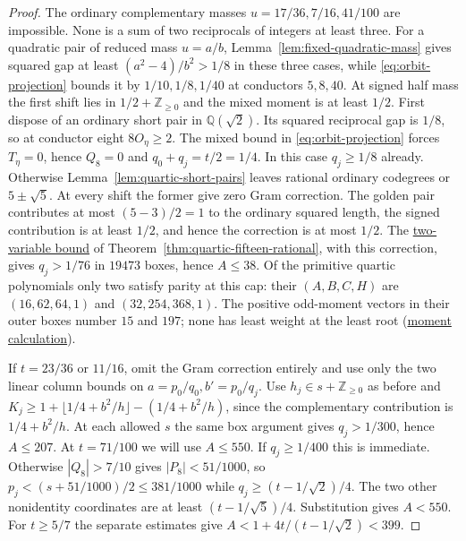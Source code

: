 \documentclass[11pt,reqno]{amsart}
\newcommand{\codecheck}[2]{\href{https://github.com/sebastienpalcoux/grothendieck-ring-classification/blob/d5750105bb5758f3ad38d2e5464dfcc12c019816/supplements/rank6/sphericality/#1}{#2}}
\theoremstyle{remark}\newtheorem{remark}[theorem]{Remark}
\numberwithin{equation}{section}
\begin{document}
\begin{proof}
The ordinary complementary masses $u=17/36,7/16,41/100$ are
impossible. None is a sum of two reciprocals of integers at least
three. For a quadratic pair of reduced mass $u=a/b$,
Lemma~\ref{lem:fixed-quadratic-mass} gives squared gap at least
$(a^2-4)/b^2>1/8$ in these three cases, while
\eqref{eq:orbit-projection} bounds it by $1/10,1/8,1/40$ at
conductors $5,8,40$.
At signed half mass the first shift lies in
$1/2+\mathbb Z_{\ge0}$ and the mixed moment is at least $1/2$.
First dispose of an ordinary short pair in $\mathbb Q(\sqrt2)$.
Its squared reciprocal gap is $1/8$, so at conductor eight
$8O_\eta\ge2$. The mixed bound in \eqref{eq:orbit-projection}
forces $T_\eta=0$, hence $Q_8=0$ and
$q_0+q_j=t/2=1/4$. In this case $q_j\ge1/8$ already.
Otherwise Lemma~\ref{lem:quartic-short-pairs} leaves rational ordinary
codegrees or $5\pm\sqrt5$. At every shift the former give zero
Gram correction. The golden pair contributes at most $(5-3)/2=1$
to the ordinary squared length, the signed contribution is at least
$1/2$, and hence the correction is at most $1/2$.
The \codecheck{quartic_more/verify.py}{two-variable bound} of
Theorem~\ref{thm:quartic-fifteen-rational}, with this correction,
gives $q_j>1/76$ in $19473$ boxes, hence $A\le38$.
Of the primitive quartic polynomials only two satisfy parity at
this cap: their $(A,B,C,H)$ are $(16,62,64,1)$ and
$(32,254,368,1)$. The positive odd-moment vectors in their outer
boxes number $15$ and $197$; none has least weight at the least root
(\codecheck{quartic_more/silvergold.py}{moment calculation}).

If $t=23/36$ or $11/16$, omit the Gram correction entirely and
use only the two linear column bounds on $a=p_0/q_0,b'=p_0/q_j$.
Use $h_j\in s+\mathbb Z_{\ge0}$ as before and
$K_j\ge1+\lfloor1/4+b^2/h\rfloor-(1/4+b^2/h)$, since the
complementary contribution is $1/4+b^2/h$. At each allowed $s$
the same box argument gives $q_j>1/300$, hence $A\le207$.
At $t=71/100$ we will use $A\le550$. If $q_j\ge1/400$ this is
immediate. Otherwise $|Q_8|>7/10$ gives $|P_8|<51/1000$, so
$p_j<(s+51/1000)/2\le381/1000$ while
$q_j\ge(t-1/\sqrt2)/4$. The two other nonidentity coordinates
are at least $(t-1/\sqrt5)/4$. Substitution gives $A<550$.
For $t\ge5/7$ the separate estimates give
$A<1+4t/(t-1/\sqrt2)<399$.


\end{proof}
\end{document}

